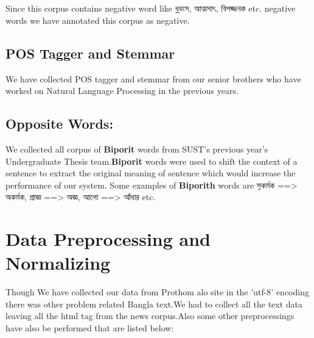 \documentclass[a4paper,12pt]{report}
\begin{document}
\\
\\
Since this corpus contains negative word like {\b ধ্বংস, আত্মসাৎ, বিপজ্জনক} etc. negative words we have annotated this corpus as negative.
 
\subsection{POS Tagger and Stemmar}
We have collected POS tagger and stemmar from our senior brothers who have worked on Natural Language Processing in the previous years.
\subsection{Opposite Words:}We collected all corpus of \textbf{Biporit} words from SUST's previous year's Undergraduate Thesis team.\textbf{Biporit} words were used to shift the context of a sentence to extract the original meaning of sentence which would increase the performance of our system.
Some examples of \textbf{Biporith} words are {\b সকর্মক  ==> অকর্মক,   প্রাজ্ঞ ==> অজ্ঞ, আলো ==> আঁধার } etc. 


\section{Data Preprocessing and Normalizing}
Though We have collected our data from Prothom alo site in the 'utf-8' encoding there was other problem related Bangla text.We had to collect all the text data leaving all the html tag from the news corpus.Also some other preprocessings have also be performed that are listed below:
\end{document}
